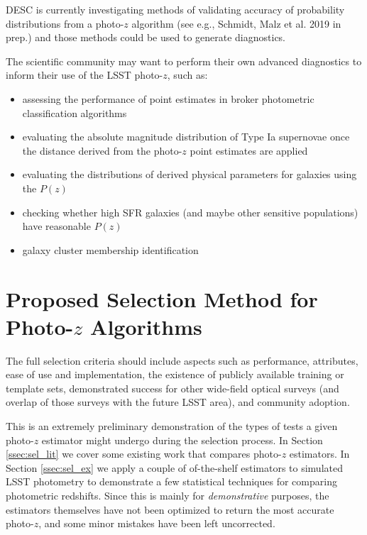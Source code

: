 \documentclass[DM,lsstdraft,toc]{lsstdoc}
\begin{document}
DESC is currently investigating methods of validating accuracy of probability distributions from a photo-$z$ algorithm (see e.g., Schmidt, Malz et al. 2019 in prep.) and those methods could be used to generate diagnostics.

The scientific community may want to perform their own advanced diagnostics to inform their use of the LSST photo-$z$, such as:
\begin{itemize}[noitemsep,topsep=-10pt]
\item assessing the performance of point estimates in broker photometric classification algorithms
\item evaluating the absolute magnitude distribution of Type Ia supernovae once the distance derived from the photo-$z$ point estimates are applied
\item evaluating the distributions of derived physical parameters for galaxies using the $P(z)$
\item checking whether high SFR galaxies (and maybe other sensitive populations) have reasonable $P(z)$
\item galaxy cluster membership identification
\end{itemize}



\section{Proposed Selection Method for Photo-$z$ Algorithms} \label{sec:sel}

The full selection criteria should include aspects such as performance, attributes, ease of use and implementation, the existence of publicly available training or template sets, demonstrated success for other wide-field optical surveys (and overlap of those surveys with the future LSST area), and community adoption.

This is an extremely preliminary demonstration of the types of tests a given photo-$z$ estimator might undergo during the selection process. 
In Section \ref{ssec:sel_lit} we cover some existing work that compares photo-$z$ estimators. 
In Section \ref{ssec:sel_ex} we apply a couple of of-the-shelf estimators to simulated LSST photometry to demonstrate a few statistical techniques for comparing photometric redshifts.
Since this is mainly for {\it demonstrative} purposes, the estimators themselves have not been optimized to return the most accurate photo-$z$, and some minor mistakes have been left uncorrected.
\end{document}
